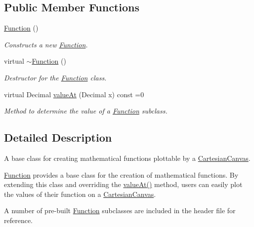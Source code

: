 \subsection*{Public Member Functions}
\begin{DoxyCompactItemize}
\item 
\hyperlink{classtsgl_1_1_function_aaf959c9d39bb45c2aded83fd754c288d}{Function} ()
\begin{DoxyCompactList}\small\item\em Constructs a new \hyperlink{classtsgl_1_1_function}{Function}. \end{DoxyCompactList}\item 
virtual \hyperlink{classtsgl_1_1_function_a3b8cbd26a32c6ae75b12e7397bb42c41}{$\sim$\-Function} ()
\begin{DoxyCompactList}\small\item\em Destructor for the \hyperlink{classtsgl_1_1_function}{Function} class. \end{DoxyCompactList}\item 
virtual Decimal \hyperlink{classtsgl_1_1_function_affb7b3b19a04efefa29a9870d666e912}{value\-At} (Decimal x) const =0
\begin{DoxyCompactList}\small\item\em Method to determine the value of a \hyperlink{classtsgl_1_1_function}{Function} subclass. \end{DoxyCompactList}\end{DoxyCompactItemize}


\subsection{Detailed Description}
A base class for creating mathematical functions plottable by a \hyperlink{classtsgl_1_1_cartesian_canvas}{Cartesian\-Canvas}. 

\hyperlink{classtsgl_1_1_function}{Function} provides a base class for the creation of mathematical functions. By extending this class and overriding the \hyperlink{classtsgl_1_1_function_affb7b3b19a04efefa29a9870d666e912}{value\-At()} method, users can easily plot the values of their function on a \hyperlink{classtsgl_1_1_cartesian_canvas}{Cartesian\-Canvas}.

A number of pre-\/built \hyperlink{classtsgl_1_1_function}{Function} subclasses are included in the header file for reference. 


